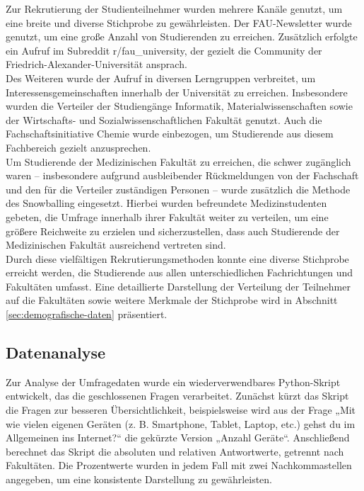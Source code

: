 \documentclass[german,report]{i1thesis}
\begin{document}
Zur Rekrutierung der Studienteilnehmer wurden mehrere Kanäle genutzt, um eine breite und diverse Stichprobe zu gewährleisten. Der FAU-Newsletter wurde genutzt, um eine große Anzahl von Studierenden zu erreichen. Zusätzlich erfolgte ein Aufruf im Subreddit r/fau\_university, der gezielt die Community der Friedrich-Alexander-Universität ansprach.
\\
Des Weiteren wurde der Aufruf in diversen Lerngruppen verbreitet, um Interessensgemeinschaften innerhalb der Universität zu erreichen. Insbesondere wurden die Verteiler der Studiengänge Informatik, Materialwissenschaften sowie der Wirtschafts- und Sozialwissenschaftlichen Fakultät genutzt. Auch die Fachschaftsinitiative Chemie wurde einbezogen, um Studierende aus diesem Fachbereich gezielt anzusprechen.
\\
Um Studierende der Medizinischen Fakultät zu erreichen, die schwer zugänglich waren – insbesondere aufgrund ausbleibender Rückmeldungen von der Fachschaft und den für die Verteiler zuständigen Personen – wurde zusätzlich die Methode des Snowballing eingesetzt. Hierbei wurden befreundete Medizinstudenten gebeten, die Umfrage innerhalb ihrer Fakultät weiter zu verteilen, um eine größere Reichweite zu erzielen und sicherzustellen, dass auch Studierende der Medizinischen Fakultät ausreichend vertreten sind.
\\
Durch diese vielfältigen Rekrutierungsmethoden konnte eine diverse Stichprobe erreicht werden, die Studierende aus allen unterschiedlichen Fachrichtungen und Fakultäten umfasst. Eine detaillierte Darstellung der Verteilung der Teilnehmer auf die Fakultäten sowie weitere Merkmale der Stichprobe wird in Abschnitt \ref{sec:demografische-daten} präsentiert.

\subsection{Datenanalyse}

Zur Analyse der Umfragedaten wurde ein wiederverwendbares Python-Skript entwickelt, das die geschlossenen Fragen verarbeitet. Zunächst kürzt das Skript die Fragen zur besseren Übersichtlichkeit, beispielsweise wird aus der Frage „Mit wie vielen eigenen Geräten (z. B. Smartphone, Tablet, Laptop, etc.) gehst du im Allgemeinen ins Internet?“ die gekürzte Version „Anzahl Geräte“. Anschließend berechnet das Skript die absoluten und relativen Antwortwerte, getrennt nach Fakultäten. Die Prozentwerte wurden in jedem Fall mit zwei Nachkommastellen angegeben, um eine konsistente Darstellung zu gewährleisten.
\end{document}
